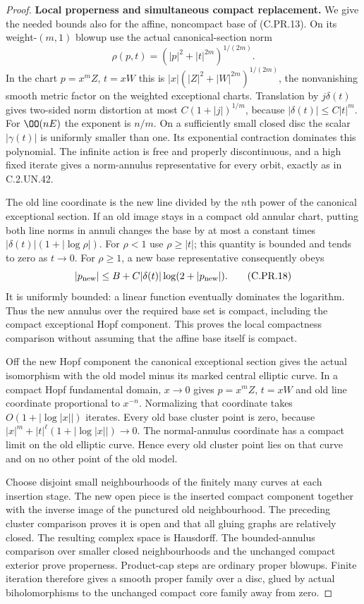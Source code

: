 \begin{proof}
\par\medskip\noindent\textbf{Local properness and simultaneous compact replacement.}
We give the needed bounds also for the affine, noncompact base
of (C.PR.13). On its weight-$(m,1)$ blowup use the actual
canonical-section norm
\[
                  \rho(p,t)=
                  (|p|^2+|t|^{2m})^{1/(2m)}.           \tag{C.PR.17}
\]
In the chart $p=x^mZ$, $t=xW$ this is
$|x|(|Z|^2+|W|^{2m})^{1/(2m)}$, the nonvanishing smooth
metric factor on the weighted exceptional charts. Translation
by $j\delta(t)$ gives two-sided norm distortion at most
$C(1+|j|)^{1/m}$, because $|\delta(t)|\le C|t|^m$.
For $\OO(nE)$ the exponent is $n/m$. On a sufficiently small
closed disc the scalar $|\gamma(t)|$ is uniformly smaller
than one. Its exponential contraction dominates this polynomial.
The infinite action is free and properly discontinuous, and
a high fixed iterate gives a norm-annulus representative for
every orbit, exactly as in C.2.UN.42.

The old line coordinate is the new line divided by the $n$th
power of the canonical exceptional section. If an old image
stays in a compact old annular chart, putting both line norms
in annuli changes the base by at most a constant times
$|\delta(t)|(1+|\log\rho|)$. For $\rho<1$ use $\rho\ge|t|$;
this quantity is bounded and tends to zero as $t\to0$.
For $\rho\ge1$, a new base representative consequently obeys
\[
 |p_{\rm new}|\le B+C|\delta(t)|\log(2+|p_{\rm new}|).
                                                        \tag{C.PR.18}
\]
It is uniformly bounded: a linear function eventually dominates
the logarithm. Thus the new annulus over the required base set
is compact, including the compact exceptional Hopf component.
This proves the local compactness comparison without assuming
that the affine base itself is compact.

Off the new Hopf component the canonical exceptional section
gives the actual isomorphism with the old model minus its
marked central elliptic curve. In a compact Hopf fundamental
domain, $x\to0$ gives $p=x^mZ$, $t=xW$ and old line coordinate
proportional to $x^{-n}$. Normalizing that coordinate takes
$O(1+|\log|x||)$ iterates. Every old base cluster point is zero,
because
$|x|^m+|t|^\ell(1+|\log|x||)\to0$.
The normal-annulus coordinate has a compact limit on the old
elliptic curve. Hence every old cluster point lies on that
curve and on no other point of the old model.

Choose disjoint small neighbourhoods of the finitely many
curves at each insertion stage. The new open piece is the
inserted compact component together with the inverse image
of the punctured old neighbourhood. The preceding cluster
comparison proves it is open and that all gluing graphs are
relatively closed. The resulting complex space is Hausdorff.
The bounded-annulus comparison over smaller closed
neighbourhoods and the unchanged compact exterior prove
properness. Product-cap steps are ordinary proper blowups.
Finite iteration therefore gives a smooth proper family over
a disc, glued by actual biholomorphisms to the unchanged
compact core family away from zero.


\end{proof}
